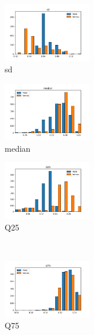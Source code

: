 \documentclass[a4paper]{article}    %
\begin{document}

\begin{figure}[H]
    \centering
    \begin{subfigure}{0.32\textwidth}
        \centering
        \includegraphics[width=3.85cm]{sbs_0_sd}
        \caption{sd}
        \label{fig:sub_sbs_1}
    \end{subfigure}
    \hfill
    \begin{subfigure}{0.32\textwidth}
        \centering
        \includegraphics[width=3.85cm]{sbs_1_median}
        \caption{median}
        \label{fig:sub_sbs_2}
    \end{subfigure}
    \hfill
    \begin{subfigure}{0.32\textwidth}
        \centering
        \includegraphics[width=3.85cm]{sbs_2_Q25}
        \caption{Q25}
        \label{fig:sub_sbs_3}
    \end{subfigure}%
    \\
    \begin{subfigure}{0.32\textwidth}
        \centering
        \includegraphics[width=3.85cm]{sbs_3_Q75}
        \caption{Q75}
        \label{fig:sub_sbs_4}
    \end{subfigure}\hfill
    \begin{subfigure}{0.32\textwidth}

\end{subfigure}
\end{figure}
\end{document}
